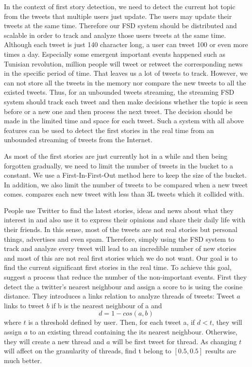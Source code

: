 \documentclass[a4paper,12pt]{article}
\begin{document}
In the context of first story detection, we need to detect the current hot topic from the tweets that multiple users just update. The users may update their tweets at the same time. Therefore our FSD system should be distributed and scalable in order to track and analyze those users tweets at the same time. Although each tweet is just 140 character long, a user can tweet 100 or even more times a day. Especially some emergent important events happened such as Tunisian revolution, million people will tweet or retweet the corresponding news in the specific period of time. That leaves us a lot of tweets to track. However, we can not store all the tweets in the memory nor compare the new tweets to all the existed tweets. Thus, for an unbounded tweets streaming, the streaming FSD system should track each tweet and then make decisions whether the topic is seen before or a new one and then process the next tweet. The decision should be made in the limited time and space for each tweet. Such a system with all above features can be used to detect the first stories in the real time from an unbounded streaming of tweets from the Internet. \newline



As most of the first stories are just currently hot in a while and then being forgotten gradually, we need to limit the number of tweets in the bucket to a constant. We use a First-In-First-Out method here to keep the size of the bucket. In addition, we also limit the number of tweets to be compared when a new tweet comes. \citep{Petrovic:2010} compares each new tweet with less than 3L tweets which it collided with. \newline

People use Twitter to find the latest stories, ideas and news about what they interest in and also use it to express their opinions and share their daily life with their friends. In this sense, most of the tweets are not real stories but personal things, advertises and even spam. Therefore, simply using the FSD system to track and analyze every tweet will lead to an incredible number of new stories and most of this are not real first stories which we do not want. Our goal is to find the current significant first stories in the real time. To achieve this goal, \citep{Petrovic:2010} suggest a process that reduce the number of the non-important events. First they detect the a twitter’s nearest neighbour and assign a score to is using the cosine distance. They introduces a links relation to analyze threads of tweets: Tweet $a$ links to tweet $b$ if b is the nearest neighbour of a and $$d=1-cos(a,b)$$
where $t$ is a threshold defined by user. Then, for each tweet a, if $d<t$, they will assign $a$ to an existing thread containing the its nearest neighbour. Otherwise, they will create a new thread and $a$ will be first tweet for thread. As changing $t$ will affect on the granularity of threads, \citep{Petrovic:2010} find t belong to $[0.5,0.5]$ results are much better.\newline
\end{document}
